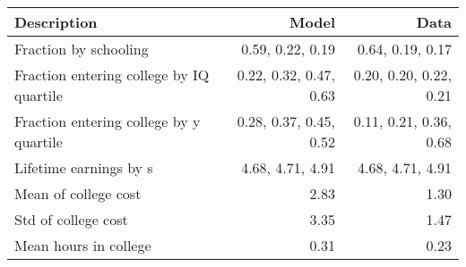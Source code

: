 \begin{tabular}{lrr}
\hline
Description & Model  & Data  \\
\hline
Fraction by schooling & 0.59, 0.22, 0.19  & 0.64, 0.19, 0.17  \\
Fraction entering college by IQ quartile & 0.22, 0.32, 0.47, 0.63  & 0.20, 0.20, 0.22, 0.21  \\
Fraction entering college by y quartile & 0.28, 0.37, 0.45, 0.52  & 0.11, 0.21, 0.36, 0.68  \\
Lifetime earnings by s & 4.68, 4.71, 4.91  & 4.68, 4.71, 4.91  \\
Mean of college cost & 2.83  & 1.30  \\
Std of college cost & 3.35  & 1.47  \\
Mean hours in college & 0.31  & 0.23  \\
\hline
\end{tabular}%
